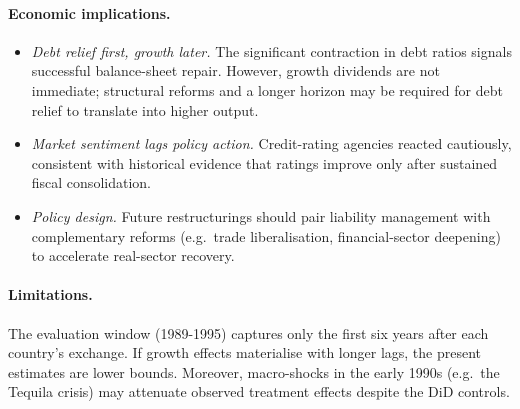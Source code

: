 \paragraph{Economic implications.}
\begin{itemize}[leftmargin=0.9cm]
    \item \emph{Debt relief first, growth later.}  The significant contraction in debt ratios signals successful balance-sheet repair.  However, growth dividends are not immediate; structural reforms and a longer horizon may be required for debt relief to translate into higher output.
    \item \emph{Market sentiment lags policy action.}  Credit-rating agencies reacted cautiously, consistent with historical evidence that ratings improve only after sustained fiscal consolidation.
    \item \emph{Policy design.}  Future restructurings should pair liability management with complementary reforms (e.g.\ trade liberalisation, financial-sector deepening) to accelerate real-sector recovery.
\end{itemize}

\paragraph{Limitations.}
The evaluation window (1989-1995) captures only the first six years after each country's exchange.  If growth effects materialise with longer lags, the present estimates are lower bounds.  Moreover, macro-shocks in the early 1990s (e.g.\ the Tequila crisis) may attenuate observed treatment effects despite the DiD controls.
